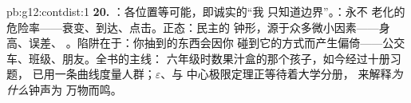 \begin{solution}{pb:g12:contdist:1}
\textbf{20.} ：各位置等可能，即诚实的“我
只知道边界”。：永不
老化的危险率——衰变、到达、点击。正态：民主的
钟形，源于众多微小因素——身高、误差、
。陷阱在于：你抽到的东西会因你
碰到它的方式而产生偏倚——公交车、班级、朋友。全书的主线：
六年级时数果汁盒的那个孩子，如今经过十册习题，
已用一条曲线度量人群；$\varepsilon$、与
中心极限定理正等待着大学分册，
来解释\emph{为什么}钟声为
万物而鸣。
\end{solution}
